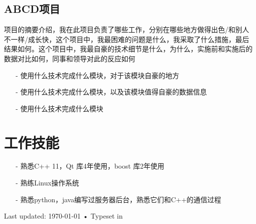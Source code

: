 \documentclass[10pt, a4paper]{article}
\newcommand{\years}[1]{\marginnote{\scriptsize #1}}
\begin{document}
\subsection*{\years{2012-2014} \textbf{ABCD项目}}
\noindent
\small{项目的摘要介绍，我在此项目负责了哪些工作，分别在哪些地方做得出色/和别人不一样/成长快，这个项目中，我最困难的问题是什么，我采取了什么措施，最后结果如何。这个项目中，我最自豪的技术细节是什么，为什么，实施前和实施后的数据对比如何，同事和领导对此的反应如何}
\begin{itemize}
  \item[-] 使用什么技术完成什么模块，对于该模块自豪的地方
  \item[-] 使用什么技术完成什么模块，以及该模块值得自豪的数据信息
  \item[-] 使用什么技术完成什么模块
\end{itemize}

\nopagebreak[4]

\section*{工作技能}
\noindent
\begin{itemize}
  \item[-] 熟悉C++ 11，Qt 库4年使用，boost 库2年使用
  \item[-] 熟练Linux操作系统
  \item[-] 熟悉python，java编写过服务器后台，熟悉它们和C++的通信过程  
\end{itemize}

\begin{center}
{\scriptsize  Last updated: \today\- •\- 
Typeset in \href{http://nitens.org/taraborelli/cvtex}{
\XeTeX }\\
}
\end{center}
\end{document}
